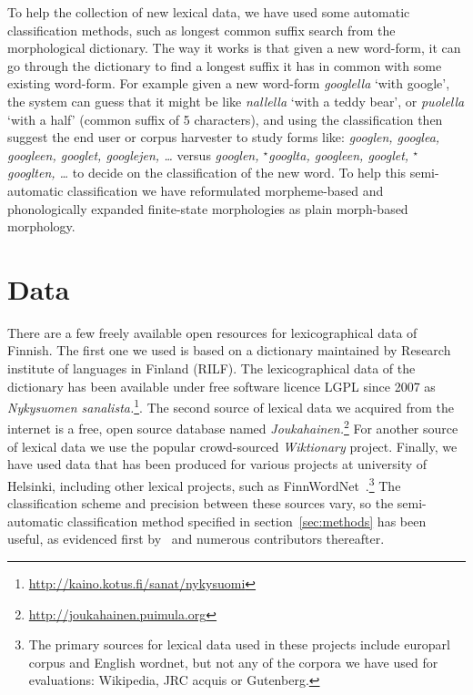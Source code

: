 \documentclass[a4paper,12pt]{article}
\begin{document}
To help the collection of new lexical data, we have used some automatic
classification methods, such as longest common suffix search from the
morphological dictionary.  The way it works is that given a new word-form, it
can go through the dictionary to find a longest suffix it has in common with
some existing word-form. For example  given a new word-form \emph{googlella}
`with google', the system can guess that it might be like \emph{nallella} `with
a teddy bear', or \emph{puolella} `with a half' (common suffix of 5
characters), and using the classification then suggest the end user or corpus
harvester to study forms like: \emph{googlen, googlea, googleen, googlet,
googlejen, \ldots} versus \emph{googlen, ${}^\star$googlta, googleen, googlet,
${}^\star$googlten, \ldots} to decide on the classification of the new word. To
help this semi-automatic classification we have reformulated morpheme-based and
phonologically expanded finite-state morphologies as plain morph-based
morphology.

\section{Data}
\label{sec:data}

There are a few freely available open resources for lexicographical data of
Finnish. The first one  we used is based on a dictionary maintained by Research
institute of languages in Finland (RILF). The lexicographical data of the
dictionary has been available under free software licence LGPL since 2007 as
\emph{Nykysuomen
sanalista.}\footnote{\url{http://kaino.kotus.fi/sanat/nykysuomi}}.  The second
source of lexical data we acquired from the internet is a free, open source
database named
\emph{Joukahainen.}\footnote{\url{http://joukahainen.puimula.org}}  For another
source of lexical data we use the popular crowd-sourced \emph{Wiktionary}
project.  Finally, we have used data that has been produced for various
projects at university of Helsinki, including other lexical projects, such as
FinnWordNet~\citep{linden2010finnwordnet}.\footnote{The primary sources for
lexical data used in these projects include europarl corpus and English
wordnet, but not any of the corpora we have used for evaluations: Wikipedia,
JRC acquis or Gutenberg.} The classification scheme and precision between
these sources vary, so the semi-automatic classification method specified in
section~\ref{sec:methods} has been useful, as evidenced first
by~\citet{listenmaa2009combining} and numerous contributors thereafter.
\end{document}

